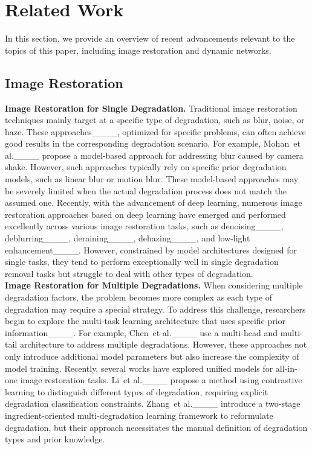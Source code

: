 \section{Related Work}
In this section, we provide an overview of recent advancements relevant to the topics of this paper, including image restoration and dynamic networks. 
\subsection{Image Restoration}
\textbf{Image Restoration for Single Degradation.} Traditional image restoration techniques mainly target at a specific type of degradation, such as blur, noise, or haze. These approaches____, optimized for specific problems, can often achieve good results in the corresponding degradation scenario. For example, Mohan~et al.____ propose a model-based approach for addressing blur caused by camera shake. However, such approaches typically rely on specific prior degradation models, such as linear blur or motion blur. These model-based approaches may be severely limited when the actual degradation process does not match the assumed one. Recently, with the advancement of deep learning, numerous image restoration approaches based on deep learning have emerged  and performed excellently across various image restoration tasks, such as denoising____, deblurring____, deraining____, dehazing____, and low-light enhancement____. However, constrained by model architectures designed for single tasks, they tend to perform exceptionally well in single degradation removal tasks but struggle to deal with other types of degradation.
\\
\textbf{Image Restoration for Multiple Degradations.} When considering multiple degradation factors, the problem becomes more complex as each type of degradation may require 
a special strategy. To address this challenge, researchers begin to explore the multi-task learning architecture that uses specific prior information____. For example, Chen~et al.____ use a multi-head and multi-tail architecture to address multiple degradations. However, these approaches not only introduce additional model parameters but also increase the complexity of model training. Recently, several works have explored unified models for all-in-one image restoration tasks. Li~et al.____ propose a method using contrastive learning to distinguish different types of degradation, requiring explicit degradation classification constraints. Zhang~et al.____ introduce a two-stage ingredient-oriented multi-degradation learning framework to reformulate degradation, but their approach necessitates the manual definition of degradation types and prior knowledge.

